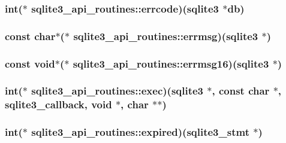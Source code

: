 \hypertarget{structsqlite3__api__routines_a0f1cf42108e6d872d03b78eaf27dfc45}{
\subsubsection[{errcode}]{\setlength{\rightskip}{0pt plus 5cm}int($\ast$ sqlite3\-\_\-api\-\_\-routines\-::errcode)({\bf sqlite3} $\ast$db)}}\label{structsqlite3__api__routines_a0f1cf42108e6d872d03b78eaf27dfc45}
\hypertarget{structsqlite3__api__routines_a8cc92411b7513a1009db9cc75bc486f5}{
\subsubsection[{errmsg}]{\setlength{\rightskip}{0pt plus 5cm}const char$\ast$($\ast$ sqlite3\-\_\-api\-\_\-routines\-::errmsg)({\bf sqlite3} $\ast$)}}\label{structsqlite3__api__routines_a8cc92411b7513a1009db9cc75bc486f5}
\hypertarget{structsqlite3__api__routines_a86767e26b770626fb788af5c7a75af9b}{
\subsubsection[{errmsg16}]{\setlength{\rightskip}{0pt plus 5cm}const void$\ast$($\ast$ sqlite3\-\_\-api\-\_\-routines\-::errmsg16)({\bf sqlite3} $\ast$)}}\label{structsqlite3__api__routines_a86767e26b770626fb788af5c7a75af9b}
\hypertarget{structsqlite3__api__routines_a16e1fe4f9dccfe8da742d7087822d379}{
\subsubsection[{exec}]{\setlength{\rightskip}{0pt plus 5cm}int($\ast$ sqlite3\-\_\-api\-\_\-routines\-::exec)({\bf sqlite3} $\ast$, const char $\ast$, {\bf sqlite3\-\_\-callback}, void $\ast$, char $\ast$$\ast$)}}\label{structsqlite3__api__routines_a16e1fe4f9dccfe8da742d7087822d379}
\hypertarget{structsqlite3__api__routines_a574080049ce24e639e7487bcfc74e06a}{
\subsubsection[{expired}]{\setlength{\rightskip}{0pt plus 5cm}int($\ast$ sqlite3\-\_\-api\-\_\-routines\-::expired)({\bf sqlite3\-\_\-stmt} $\ast$)}}\label{structsqlite3__api__routines_a574080049ce24e639e7487bcfc74e06a}
